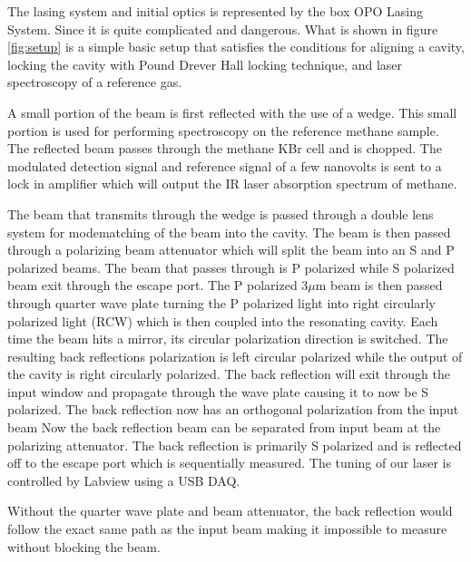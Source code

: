 \documentclass[a4paper]{book}
\newcommand{\imginput}[1]{} %
\begin{document}
		The lasing system and initial optics is represented by the box OPO Lasing System. Since it is quite complicated and dangerous. What is shown in figure \ref{fig:setup} is a simple basic setup that satisfies the conditions for aligning a cavity, locking the cavity with Pound Drever Hall locking technique, and laser spectroscopy of a reference gas.
		
		A small portion of the beam is first reflected with the use of a wedge. This small portion is used for performing spectroscopy on the reference methane sample. The reflected beam passes through the methane KBr cell and is chopped. The modulated detection signal and reference signal of a few nanovolts is sent to a lock in amplifier which will output the IR laser absorption spectrum of methane.
		
		\begin{figure} [!ht]
			\centering
			\resizebox{160mm}{!}{\imginput{images/ircease-setup.pdf_tex}}
			\caption{}
			\label{fig:ircease-setup}
		\end{figure}
		
		The beam that transmits through the wedge is passed through a double lens system for modematching of the beam into the cavity. The beam is then passed through a polarizing beam attenuator which will split the beam into an S and P polarized beams. The beam that passes through is P polarized while S polarized beam exit through the escape port. The P polarized 3$\mu$m beam is then passed  through quarter wave plate turning the P polarized light into  right circularly polarized light (RCW) which is then coupled into the resonating cavity. Each time the beam hits a mirror, its circular polarization direction is switched. The resulting back reflections polarization is left circular polarized while the output of the cavity is right circularly polarized. The back reflection will exit through the input window and propagate through the wave plate causing it to now be S polarized. The back reflection now has an orthogonal polarization from the input beam Now the back reflection beam can be separated from input beam at the polarizing attenuator. The back reflection is primarily S polarized and is reflected off to the escape port which is sequentially measured.
		The tuning of our laser is controlled by Labview using a USB DAQ.
		
		Without the quarter wave plate and beam attenuator, the back reflection would follow the exact same path as the input beam making it impossible to measure without blocking the beam.
		
\end{document}
